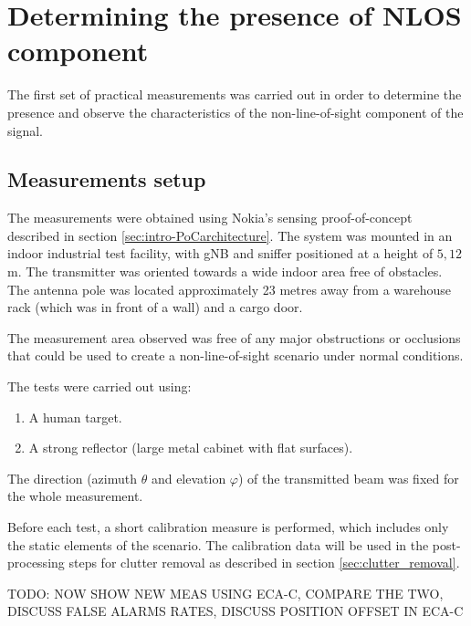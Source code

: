\chapter{Determining the presence of NLOS component}

The first set of practical measurements was carried out in order to determine the presence and observe the characteristics of the non-line-of-sight component of the signal. 

\section{Measurements setup}
\label{sec:Test1_meas_scenario}

The measurements were obtained using Nokia's sensing proof-of-concept described in section \ref{sec:intro-PoCarchitecture}. The system was mounted in an indoor industrial test facility, with gNB and sniffer positioned at a height of $5,12$ m. The transmitter was oriented towards a wide  indoor area free of obstacles. The antenna pole was located approximately 23 metres away from a warehouse rack (which was in front of a wall) and a cargo door.

The measurement area observed was free of any major obstructions or occlusions that could be used to create a non-line-of-sight scenario under normal conditions. 
 


The tests were carried out using:

\begin{enumerate}
	\item A human target.
	\item A strong reflector (large metal cabinet with flat surfaces).
\end{enumerate}

The direction (azimuth $\theta$ and elevation $\varphi$) of the transmitted beam was fixed for the whole measurement.

Before each test, a short calibration measure is performed, which includes only the static elements of the scenario. The calibration data will be used in the post-processing steps for clutter removal as described in section \ref{sec:clutter_removal}.

\alert{TODO: NOW SHOW NEW MEAS USING ECA-C, COMPARE THE TWO, DISCUSS FALSE ALARMS RATES, DISCUSS POSITION OFFSET IN ECA-C}


